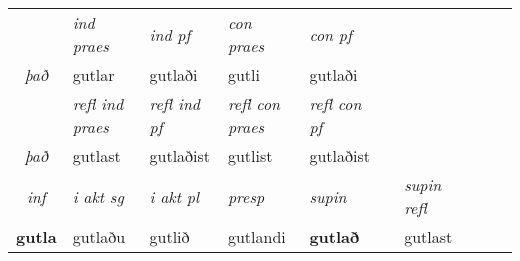 \begin{tabular}{lllllllllll}
   & &  \textit{ind praes} & \textit{ind pf} & \textit{con praes} & \textit{con pf} \\*
\multicolumn{2}{c}{ \textit{það} } & gutlar & gutlaði & gutli & gutlaði \\*

\cmidrule{3-6}
 & & \textit{refl ind praes} & \textit{refl ind pf} & \textit{refl con praes} & \textit{refl con pf} \\*
 \multicolumn{2}{c}{ \textit{það} }& gutlast & gutlaðist & gutlist & gutlaðist \\*

\cmidrule{3-8}
   \multicolumn{2}{c}{\textit{inf}}  & \textit{i akt sg} & \textit{i akt pl}   & \textit{presp} & \textit{supin} && \textit{supin refl}  \\*
  \multicolumn{2}{c}{\textbf{gutla}} & gutlaðu  & gutlið   & gutlandi &  \textbf{gutlað} && gutlast  \\*
\end{tabular}

